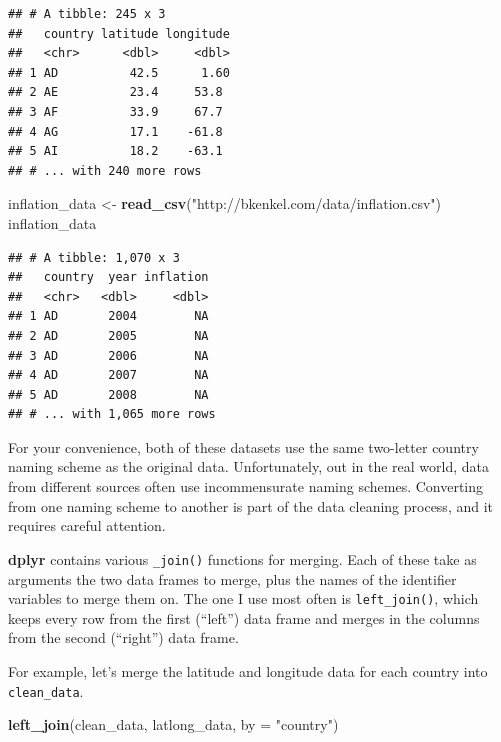 \documentclass[
  12pt,
  oneside,openany]{book}
\newenvironment{Shaded}{\begin{snugshade}}{\end{snugshade}}
\newcommand{\DataTypeTok}[1]{\textcolor[rgb]{0.13,0.29,0.53}{#1}}
\newcommand{\KeywordTok}[1]{\textcolor[rgb]{0.13,0.29,0.53}{\textbf{#1}}}
\newcommand{\NormalTok}[1]{#1}
\newcommand{\StringTok}[1]{\textcolor[rgb]{0.31,0.60,0.02}{#1}}
\begin{document}
\begin{verbatim}
## # A tibble: 245 x 3
##   country latitude longitude
##   <chr>      <dbl>     <dbl>
## 1 AD          42.5      1.60
## 2 AE          23.4     53.8 
## 3 AF          33.9     67.7 
## 4 AG          17.1    -61.8 
## 5 AI          18.2    -63.1 
## # ... with 240 more rows
\end{verbatim}

\begin{Shaded}
\begin{Highlighting}[]
\NormalTok{inflation\_data \textless{}{-}}\StringTok{ }\KeywordTok{read\_csv}\NormalTok{(}\StringTok{"http://bkenkel.com/data/inflation.csv"}\NormalTok{)}
\NormalTok{inflation\_data}
\end{Highlighting}
\end{Shaded}

\begin{verbatim}
## # A tibble: 1,070 x 3
##   country  year inflation
##   <chr>   <dbl>     <dbl>
## 1 AD       2004        NA
## 2 AD       2005        NA
## 3 AD       2006        NA
## 4 AD       2007        NA
## 5 AD       2008        NA
## # ... with 1,065 more rows
\end{verbatim}

For your convenience, both of these datasets use the same two-letter country naming scheme as the original data. Unfortunately, out in the real world, data from different sources often use incommensurate naming schemes. Converting from one naming scheme to another is part of the data cleaning process, and it requires careful attention.

\textbf{dplyr} contains various \texttt{\_join()} functions for merging. Each of these take as arguments the two data frames to merge, plus the names of the identifier variables to merge them on. The one I use most often is \texttt{left\_join()}, which keeps every row from the first (``left'') data frame and merges in the columns from the second (``right'') data frame.

For example, let's merge the latitude and longitude data for each country into \texttt{clean\_data}.

\begin{Shaded}
\begin{Highlighting}[]
\KeywordTok{left\_join}\NormalTok{(clean\_data,}
\NormalTok{          latlong\_data,}
          \DataTypeTok{by =} \StringTok{"country"}\NormalTok{)}
\end{Highlighting}
\end{Shaded}
\end{document}
